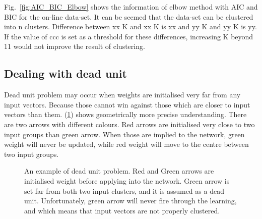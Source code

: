 \documentclass[12pt,a4paper]{report}
\begin{document}
\bigskip
Fig.~\ref{fig:AIC_BIC_Elbow} shows the information of elbow method with AIC and BIC for the on-line data-set. It can be seemed that the data-set can be clustered into n clusters. Difference between xx K and xx K is xx and yy K and yy K is yy. If the value of ccc is set as a threshold for these differences, increasing K beyond 11 would not improve the result of clustering.

\subsection{Dealing with dead unit}
Dead unit problem may occur when weights are initialised very far from any input vectors. Because those cannot win against those which are closer to input vectors than them. (\ref{fig:dead_unit}) shows geometrically more precise understanding. There are two arrows with different colours. Red arrows are initialised very close to two input groups than green arrow. When those are implied to the network, green weight will never be updated, while red weight will move to the centre between two input groups. 

\begin{comment}
Fig. 8 shows more precise understanding. There are two weight vectors with coloured crosses and arrows in its direction. The weight vector with red cross are closer to both clusters of inputs, and green coloured weight is far from this clusters. For all comparisons in (4), the output with red weight vector always wins, and green one never fires and also would never be updated to be closer to the inputs, even though two clusters need to have a weight vector in its centre. Unfortunately, at the end of the learning, the weight with red cross will be positioned in the middle of two clusters, and green weight is at the same location as before the learning.
\end{comment}

\begin{figure}[thpb] \label{fig:dead_unit}
	\centering
	\caption{An example of dead unit problem. Red and Green arrows are initialised weight before applying into the network. Green arrow is set far from both two input clusters, and it is assumed as a dead unit. Unfortunately, green arrow will never fire through the learning, and which means that input vectors are not properly clustered.}
\end{figure}
\end{document}
